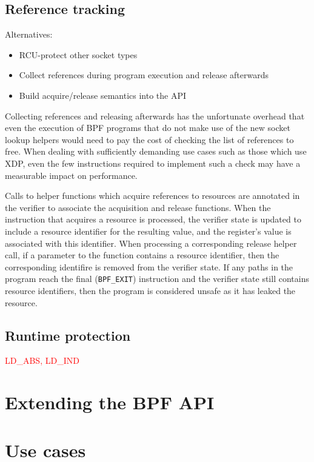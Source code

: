 \documentclass[10pt,sigconf,authorversion]{lpc}
\newcommand\todo[1]{\textcolor{red}{#1}}
\begin{document}
\subsection{Reference tracking}

Alternatives:
\begin{itemize}
\item RCU-protect other socket types
\item Collect references during program execution and release afterwards
\item Build acquire/release semantics into the API
\end{itemize}

Collecting references and releasing afterwards has the unfortunate overhead
that even the execution of BPF programs that do not make use of the new socket
lookup helpers would need to pay the cost of checking the list of references
to free. When dealing with sufficiently demanding use cases such as those which
use XDP, even the few instructions required to implement such a check may have
a measurable impact on performance.

Calls to helper functions which acquire references to resources are annotated
in the verifier to associate the acquisition and release functions. When the
instruction that acquires a resource is processed, the verifier state is
updated to include a resource identifier for the resulting value, and the
register's value is associated with this identifier. When processing a
corresponding release helper call, if a parameter to the function contains a
resource identifier, then the corresponding identifire is removed from the
verifier state. If any paths in the program reach the final (\verb+BPF_EXIT+)
instruction and the verifier state still contains resource identifiers, then
the program is considered unsafe as it has leaked the resource.

\subsection{Runtime protection}

\todo{LD\_ABS, LD\_IND}

\section{Extending the BPF API}



\section{Use cases}
\end{document}
